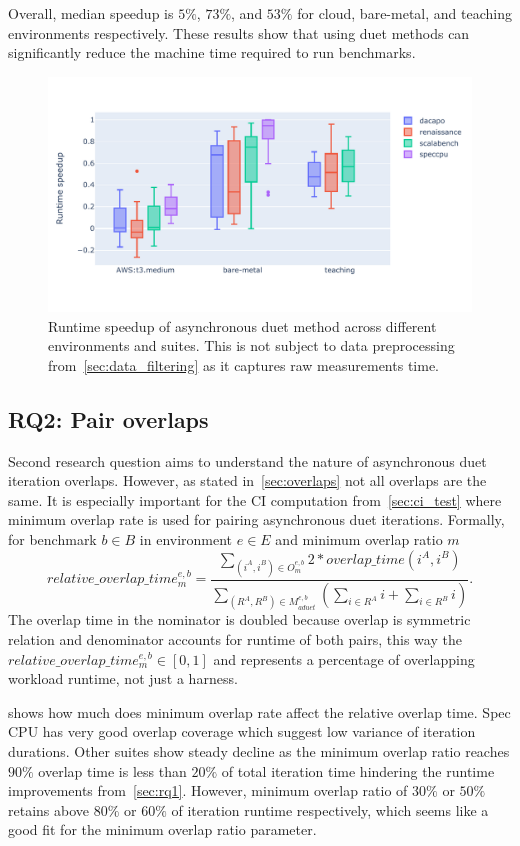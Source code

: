 Overall, median speedup is $5\%$, $73\%$, and $53\%$ for cloud, bare-metal, and teaching environments respectively.
These results show that using duet methods can significantly reduce the machine time required to run benchmarks.

\begin{figure}
	\centering
	\includegraphics[width=.9\linewidth]{./figures/runtime_speedup.pdf}
	\caption{
		Runtime speedup of asynchronous duet method across different environments and suites.
		This is not subject to data preprocessing from~\cref{sec:data_filtering} as it captures raw measurements time.
	}
	\label{fig:runtime_speedup}
\end{figure}

\subsection{RQ2: Pair overlaps}
\label{sec:rq2}

Second research question aims to understand the nature of asynchronous duet iteration overlaps.
However, as stated in~\cref{sec:overlaps} not all overlaps are the same.
It is especially important for the CI computation from~\ref{sec:ci_test} where minimum overlap rate is used for pairing asynchronous duet iterations.
Formally, for benchmark $b \in B$ in environment $e \in E$ and minimum overlap ratio $m$
$$
relative\_overlap\_time^{e, b}_m = \frac{\sum\limits_{(i^A, i^B) \in O^{e,b}_m} 2 * overlap\_time(i^A, i^B)}{\sum\limits_{(R^A, R^B) \in M^{e, b}_{aduet}}(\sum\limits_{i \in R^A} i + \sum\limits_{i \in R^B} i)}.
$$
The overlap time in the nominator is doubled because overlap is symmetric relation and denominator accounts for runtime of both pairs, this way the $relative\_overlap\_time^{e, b}_m \in [0, 1]$ and represents a percentage of overlapping workload runtime, not just a harness.

 shows how much does minimum overlap rate affect the relative overlap time.
Spec CPU has very good overlap coverage which suggest low variance of iteration durations.
Other suites show steady decline as the minimum overlap ratio reaches $90\%$ overlap time is less than $20\%$ of total iteration time hindering the runtime improvements from~\cref{sec:rq1}.
However, minimum overlap ratio of $30\%$ or $50\%$ retains above $80\%$ or $60\%$ of iteration runtime respectively, which seems like a good fit for the minimum overlap ratio parameter.

